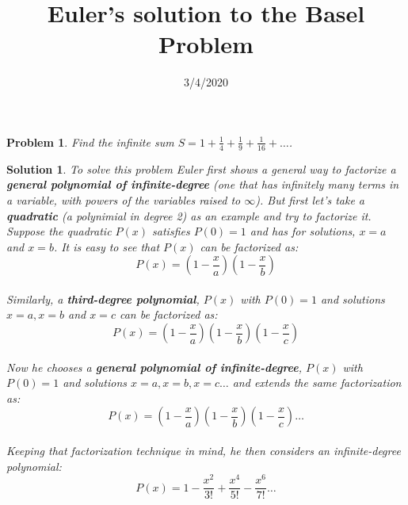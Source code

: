 \documentclass{article}
\title{Euler's solution to the Basel Problem}
\date{3/4/2020}
\newtheorem*{problem*}{Problem}
\newtheorem*{solution*}{Solution}
\begin{document}
\maketitle
 
\begin{problem*}
    Find the infinite sum
    $S=1+\frac{1}{4}+\frac{1}{9}+\frac{1}{16}+\dots$.
\end{problem*}

\begin{solution*}
    To solve this problem Euler first shows
    a general way to factorize a \textbf{general polynomial of infinite-degree}
    (one that has infinitely many terms in a variable,
    with powers of the variables raised to $\infty$).
    But first let's take a \textbf{quadratic} 
    (a polynimial in degree 2) as an example and 
    try to factorize it. Suppose the quadratic $P(x)$ 
    satisfies $P(0)=1$ and has for solutions, 
    $x=a$ and $x=b$. It is easy to see that $P(x)$
    can be factorized as:\\
    
    \begin{equation*}
        P(x)=(1-\frac{x}{a})(1-\frac{x}{b})
    \end{equation*}\\
    
    Similarly, a \textbf{third-degree polynomial}, $P(x)$ 
    with $P(0)=1$ and solutions $x=a,x=b$ and $x=c$ 
    can be factorized as:\\
    
    \begin{equation*}
        P(x)=(1-\frac{x}{a})(1-\frac{x}{b})(1-\frac{x}{c})
    \end{equation*}\\

    Now he chooses a \textbf{general polynomial of infinite-degree}, 
    $P(x)$ with $P(0)=1$ and solutions $x=a,x=b,x=c\dots$
    and extends the same factorization as:\\
    
    \begin{equation*}
        P(x)=(1-\frac{x}{a})(1-\frac{x}{b})(1-\frac{x}{c})\dots
    \end{equation*}\\

    Keeping that factorization technique in mind,
    he then considers an infinite-degree polynomial:\\

    \begin{equation}
        P(x) = 1-\frac{x^2}{3!}+\frac{x^4}{5!}-\frac{x^6}{7!}\dots
    \end{equation}\\


\end{solution*}
\end{document}
